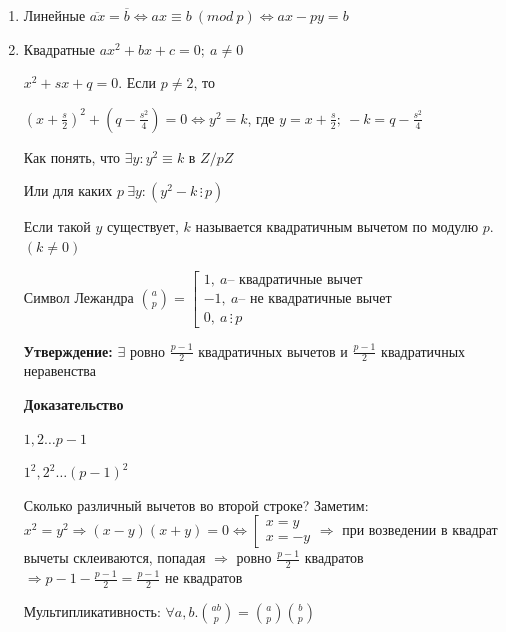 \documentclass[14pt, letter paper]{article}
\begin{document}
\begin{enumerate}
    \item Линейные $\overline{ax} = \overline{b} \Leftrightarrow ax \equiv b\ (mod\ p) \Leftrightarrow ax - py = b$

    \item Квадратные $ax^2 + bx + c = 0;\ a \neq 0$

    $x^2 + sx + q = 0$. Если $p \neq 2$, то

    $(x + \frac{s}{2})^2 + (q - \frac{s^2}{4}) = 0 \Leftrightarrow y^2 = k$, где $y = x + \frac{s}{2};\ -k = q - \frac{s^2}{4}$

    Как понять, что $\exists y : y^2 \equiv k$ в $Z/pZ$

    Или для каких $p\ \exists y : (y^2 - k \, \vdots \, p)$

    Если такой $y$ существует, $k$ называется квадратичным вычетом по модулю $p$. $(k \neq 0)$

    Символ Лежандра ${a \choose p} = \left[ \begin{gathered}
        1,\ a \text{-- квадратичные вычет} \\
        -1,\ a \text{-- не квадратичные вычет} \\
        0,\ a \, \vdots \, p
    \end{gathered} \right.$

    \textbf{Утверждение:} $\exists$ ровно $\frac{p-1}{2}$ квадратичных вычетов и $\frac{p-1}{2}$ квадратичных неравенства

    \begin{center}
        \textbf{Доказательство}
    \end{center}

    $1, 2 \ldots p-1$

    $1^2, 2^2 \ldots (p-1)^2$

    Сколько различный вычетов во второй строке? Заметим: $x^2 = y^2 \Rightarrow (x-y)(x+y) = 0 \Leftrightarrow \left[ \begin{gathered}
        x = y \\
        x = -y
    \end{gathered} \right. \Rightarrow$ при возведении в квадрат вычеты склеиваются, попадая $\Rightarrow$ ровно $\frac{p-1}{2}$ квадратов $\Rightarrow p-1 - \frac{p-1}{2} = \frac{p-1}{2}$ не квадратов

    \vspace{5mm}

    Мультипликативность: $\forall a, b. {ab \choose p} = {a \choose p}{b \choose p}$


\end{enumerate}
\end{document}
